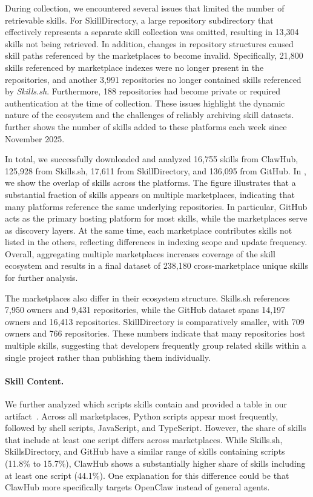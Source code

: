 During collection, we encountered several issues that limited the number of retrievable skills.
For SkillDirectory, a large repository subdirectory that effectively represents a separate skill collection was omitted, resulting in 13{,}304 skills not being retrieved.
In addition, changes in repository structures caused skill paths referenced by the marketplaces to become invalid.
Specifically, 21{,}800 skills referenced by marketplace indexes were no longer present in the repositories, and another 3{,}991 repositories no longer contained skills referenced by \textit{Skills.sh}.
Furthermore, 188 repositories had become private or required authentication at the time of collection.
These issues highlight the dynamic nature of the ecosystem and the challenges of reliably archiving skill datasets.
 further shows the number of skills added to these platforms each week since November 2025.

In total, we successfully downloaded and analyzed 16{,}755 skills from ClawHub, 125{,}928 from Skills.sh, 17{,}611 from SkillDirectory, and 136{,}095 from GitHub.
In , we show the overlap of skills across the platforms.
The figure illustrates that a substantial fraction of skills appears on multiple marketplaces, indicating that many platforms reference the same underlying repositories.
In particular, GitHub acts as the primary hosting platform for most skills, while the marketplaces serve as discovery layers.
At the same time, each marketplace contributes skills not listed in the others, reflecting differences in indexing scope and update frequency.
Overall, aggregating multiple marketplaces increases coverage of the skill ecosystem and results in a final dataset of 238{,}180 cross-marketplace unique skills for further analysis.

The marketplaces also differ in their ecosystem structure.
Skills.sh references 7{,}950 owners and 9{,}431 repositories, while the GitHub dataset spans 14{,}197 owners and 16{,}413 repositories.
SkillDirectory is comparatively smaller, with 709 owners and 766 repositories.
These numbers indicate that many repositories host multiple skills, suggesting that developers frequently group related skills within a single project rather than publishing them individually.

\paragraph{Skill Content.}

We further analyzed which scripts skills contain and provided a table in our artifact~\cite{artifact:skill_scripts}.
Across all marketplaces, Python scripts appear most frequently, followed by shell scripts, JavaScript, and TypeScript. However, the share of skills that include at least one script differs across marketplaces. While Skills.sh, SkillsDirectory, and GitHub have a similar range of skills containing scripts (11.8\% to 15.7\%), ClawHub shows a substantially higher share of skills including at least one script (44.1\%). One explanation for this difference could be that ClawHub more specifically targets OpenClaw instead of general agents.

